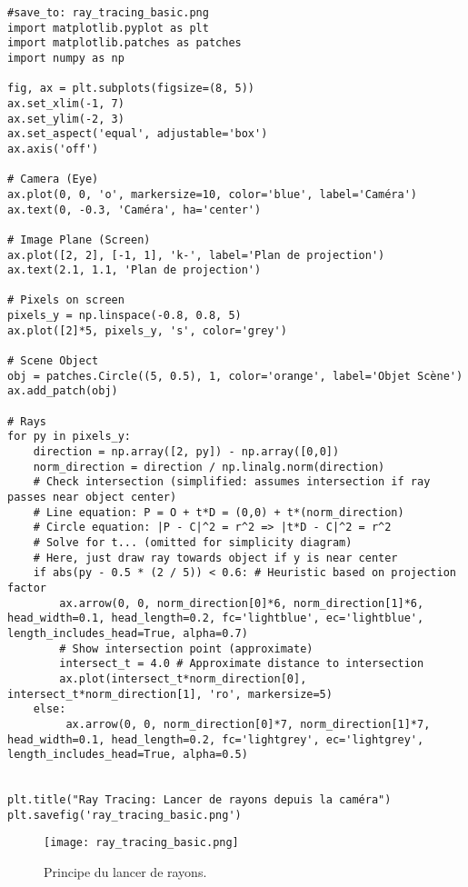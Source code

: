 \documentclass{article}
\begin{document}
\begin{verbatim}
#save_to: ray_tracing_basic.png
import matplotlib.pyplot as plt
import matplotlib.patches as patches
import numpy as np

fig, ax = plt.subplots(figsize=(8, 5))
ax.set_xlim(-1, 7)
ax.set_ylim(-2, 3)
ax.set_aspect('equal', adjustable='box')
ax.axis('off')

# Camera (Eye)
ax.plot(0, 0, 'o', markersize=10, color='blue', label='Caméra')
ax.text(0, -0.3, 'Caméra', ha='center')

# Image Plane (Screen)
ax.plot([2, 2], [-1, 1], 'k-', label='Plan de projection')
ax.text(2.1, 1.1, 'Plan de projection')

# Pixels on screen
pixels_y = np.linspace(-0.8, 0.8, 5)
ax.plot([2]*5, pixels_y, 's', color='grey')

# Scene Object
obj = patches.Circle((5, 0.5), 1, color='orange', label='Objet Scène')
ax.add_patch(obj)

# Rays
for py in pixels_y:
    direction = np.array([2, py]) - np.array([0,0])
    norm_direction = direction / np.linalg.norm(direction)
    # Check intersection (simplified: assumes intersection if ray passes near object center)
    # Line equation: P = O + t*D = (0,0) + t*(norm_direction)
    # Circle equation: |P - C|^2 = r^2 => |t*D - C|^2 = r^2
    # Solve for t... (omitted for simplicity diagram)
    # Here, just draw ray towards object if y is near center
    if abs(py - 0.5 * (2 / 5)) < 0.6: # Heuristic based on projection factor
        ax.arrow(0, 0, norm_direction[0]*6, norm_direction[1]*6, head_width=0.1, head_length=0.2, fc='lightblue', ec='lightblue', length_includes_head=True, alpha=0.7)
        # Show intersection point (approximate)
        intersect_t = 4.0 # Approximate distance to intersection
        ax.plot(intersect_t*norm_direction[0], intersect_t*norm_direction[1], 'ro', markersize=5)
    else:
         ax.arrow(0, 0, norm_direction[0]*7, norm_direction[1]*7, head_width=0.1, head_length=0.2, fc='lightgrey', ec='lightgrey', length_includes_head=True, alpha=0.5)


plt.title("Ray Tracing: Lancer de rayons depuis la caméra")
plt.savefig('ray_tracing_basic.png')
\end{verbatim}

\begin{figure}[H]
\centering
\texttt{[image: ray\_tracing\_basic.png]}
\caption{Principe du lancer de rayons.}
\label{fig:ray_tracing_basic}
\end{figure}
\end{document}
